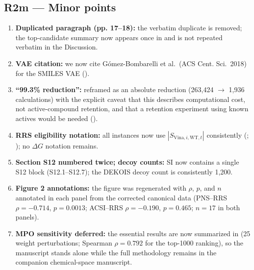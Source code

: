 \documentclass[11pt]{article}
\begin{document}
\subsection*{R2m --- Minor points}
\begin{enumerate}[leftmargin=1.6em]
\item \textbf{Duplicated paragraph (pp. 17--18):} the verbatim duplicate is removed; the
top-candidate summary now appears once in  and is not repeated verbatim in the
Discussion.
\item \textbf{VAE citation:} we now cite G\'omez-Bombarelli et al.\ (ACS Cent. Sci.\ 2018)
for the SMILES VAE ().
\item \textbf{``99.3\% reduction'':} reframed as an absolute reduction (263{,}424 $\rightarrow$
1{,}936 calculations) with the explicit caveat that this describes computational cost, not
active-compound retention, and that a retention experiment using known actives would be needed
().
\item \textbf{RRS eligibility notation:} all instances now use $|S_{\mathrm{Vina},i,\mathrm{WT},t}|$
consistently (; ); no $\Delta G$ notation remains.
\item \textbf{Section S12 numbered twice; decoy counts:} SI now contains a single S12 block
(S12.1--S12.7); the DEKOIS decoy count is consistently 1{,}200.
\item \textbf{Figure 2 annotations:} the figure was regenerated with $\rho$, $p$, and $n$
annotated in each panel from the corrected canonical data (PNS--RRS $\rho=-0.714$,
$p=0.0013$; ACSI--RRS $\rho=-0.190$, $p=0.465$; $n=17$ in both panels).
\item \textbf{MPO sensitivity deferred:} the essential results are now summarized in 
(25 weight perturbations; Spearman $\rho=0.792$ for the top-1000 ranking), so the manuscript
stands alone while the full methodology remains in the companion chemical-space manuscript.
\end{enumerate}
\end{document}
